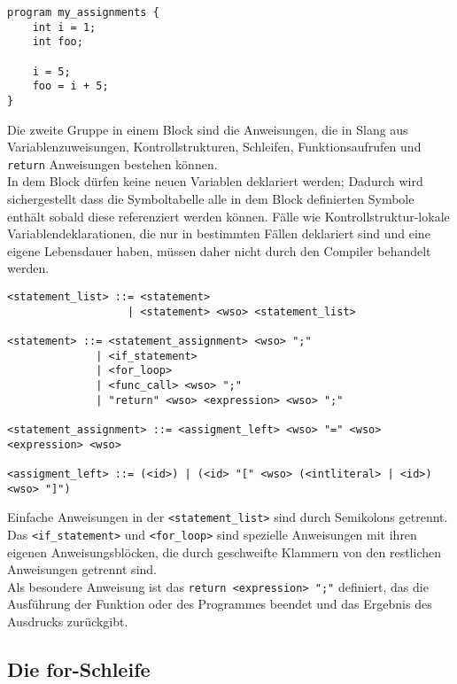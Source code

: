 \begin{lstlisting}[caption={Slang Beispiel Zuweisungen}]
program my_assignments {
    int i = 1;
    int foo;

    i = 5;
    foo = i + 5;
}
\end{lstlisting}

Die zweite Gruppe in einem Block sind die Anweisungen, die in Slang aus Variablenzuweisungen, Kontrollstrukturen, Schleifen, Funktionsaufrufen und \texttt{return} Anweisungen bestehen können.\\

In dem Block dürfen keine neuen Variablen deklariert werden; Dadurch wird sichergestellt dass die Symboltabelle alle in dem Block definierten Symbole enthält sobald diese referenziert werden können.
Fälle wie Kontrollstruktur-lokale Variablendeklarationen, die nur in bestimmten Fällen deklariert sind und eine eigene Lebensdauer haben, müssen
daher nicht durch den Compiler behandelt werden.

\begin{lstlisting}[caption={Grammatikdefinition Zuweisungen}]
<statement_list> ::= <statement>
                   | <statement> <wso> <statement_list>

<statement> ::= <statement_assignment> <wso> ";"
              | <if_statement>
              | <for_loop>
              | <func_call> <wso> ";"
              | "return" <wso> <expression> <wso> ";"

<statement_assignment> ::= <assigment_left> <wso> "=" <wso> <expression> <wso>

<assigment_left> ::= (<id>) | (<id> "[" <wso> (<intliteral> | <id>) <wso> "]")
\end{lstlisting}

Einfache Anweisungen in der \texttt{<statement\_list>} sind durch Semikolons getrennt.
Das \texttt{<if\_statement>} und \texttt{<for\_loop>} sind spezielle Anweisungen mit ihren eigenen Anweisungsblöcken, die durch geschweifte Klammern von den restlichen Anweisungen getrennt sind.\\
Als besondere Anweisung ist das \texttt{return <expression> ";"} definiert, das die Ausführung der Funktion oder des Programmes beendet und das Ergebnis des Ausdrucks zurückgibt.\\

\subsection{Die for-Schleife}

